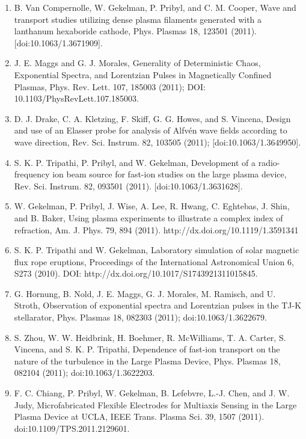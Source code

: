 \documentclass[11pt]{article}
\begin{document}
\begin{enumerate}
\item   B. Van Compernolle, W. Gekelman, P. Pribyl, and C. M. Cooper, Wave and transport studies utilizing dense plasma filaments generated with a lanthanum hexaboride cathode, Phys. Plasmas 18, 123501 (2011). [doi:10.1063/1.3671909].

\item  J. E. Maggs and G. J. Morales, Generality of Deterministic Chaos, Exponential Spectra, and Lorentzian Pulses in Magnetically Confined Plasmas, Phys. Rev. Lett. 107, 185003 (2011); DOI: 10.1103/PhysRevLett.107.185003.

\item  D. J. Drake, C. A. Kletzing, F. Skiff, G. G. Howes, and S. Vincena, Design and use of an Elasser probe for analysis of Alfv\'{e}n wave fields according to wave direction, Rev. Sci. Instrum. 82, 103505 (2011); [doi:10.1063/1.3649950].

\item   S. K. P. Tripathi, P. Pribyl, and W. Gekelman, Development of a radio-frequency ion beam source for fast-ion studies on the large plasma device, Rev. Sci. Instrum. 82, 093501 (2011). [doi:10.1063/1.3631628].

\item   W. Gekelman, P. Pribyl, J. Wise, A. Lee, R. Hwang, C. Eghtebas, J. Shin, and B. Baker, Using plasma experiments to illustrate a complex index of refraction, Am. J. Phys. 79, 894  (2011). http://dx.doi.org/10.1119/1.3591341

\item   S. K. P. Tripathi and W. Gekelman, Laboratory simulation of solar magnetic flux rope eruptions, Proceedings of the International Astronomical Union 6, S273 (2010).  DOI: http://dx.doi.org/10.1017/S1743921311015845.

\item   G. Hornung, B. Nold, J. E. Maggs, G. J. Morales, M. Ramisch, and U. Stroth, Observation of exponential spectra and Lorentzian pulses in the TJ-K stellarator, Phys. Plasmas 18, 082303 (2011); doi:10.1063/1.3622679.

\item  S. Zhou, W. W. Heidbrink, H. Boehmer, R. McWilliams, T. A. Carter, S. Vincena, and S. K. P. Tripathi, Dependence of fast-ion transport on the nature of the turbulence in the Large Plasma Device, Phys. Plasmas 18, 082104 (2011); doi:10.1063/1.3622203.

\item  F. C. Chiang, P. Pribyl, W. Gekelman, B. Lefebvre, L.-J. Chen, and J. W. Judy,  Microfabricated Flexible Electrodes for Multiaxis Sensing in the Large Plasma Device at UCLA, IEEE Trans. Plasma Sci. 39, 1507 (2011). doi:10.1109/TPS.2011.2129601.


\end{enumerate}
\end{document}
